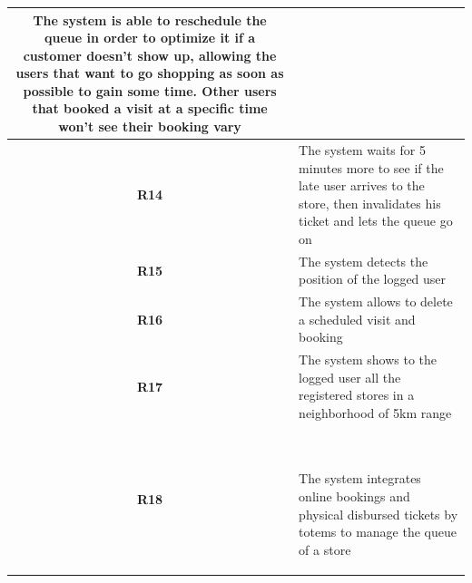 \documentclass[]{article}
\begin{document}
\begin{tabular}{|c|l|}
\begin{minipage}[t]{13cm}
						The system is able to reschedule the queue in order to optimize it if a customer doesn’t show up, allowing the users that want to go shopping as soon as possible to gain some time. Other users that booked a visit at a specific time won’t see their booking vary
					\end{minipage}
				\\ \hline				
				\textbf{R14} & 
					\begin{minipage}[t]{13cm}
						The system waits for 5  minutes more to see if the late user arrives to the store, then invalidates his ticket and lets the queue go on
					\end{minipage}
				\\ \hline				
				\textbf{R15} & 
					\begin{minipage}[t]{13cm}
						The system detects the position of the logged user
					\end{minipage}
				\\ \hline				
				\textbf{R16} & 
					\begin{minipage}[t]{13cm}
						The system allows to delete a scheduled visit and booking
					\end{minipage}
				\\ \hline				
				\textbf{R17} & 
					\begin{minipage}[t]{13cm}
						The system shows to the logged user all the registered stores in a neighborhood of 5km range
					\end{minipage}
				\\ \hline				
				\textbf{R18} & \
					\begin{minipage}[t]{13cm}
						The system integrates online bookings and physical disbursed tickets by totems to manage the queue of a store
					\end{minipage}
				\\ \hline	
				\end{tabular}
			\newpage
			
\end{document}

